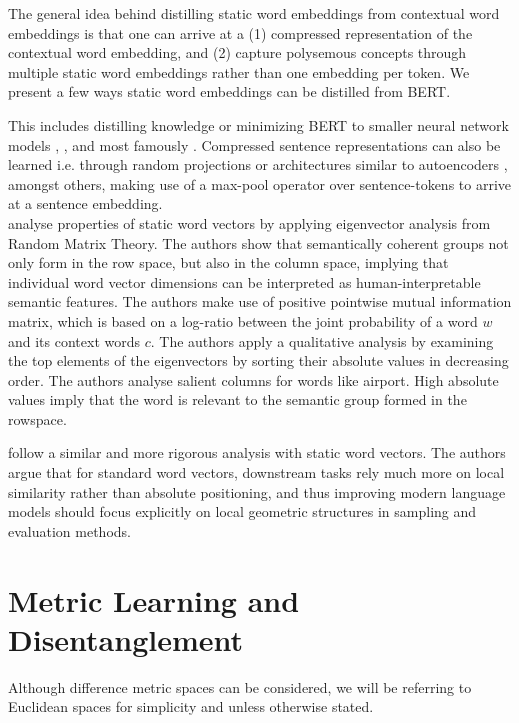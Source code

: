 \documentclass[a4paper,12pt,oneside,openright]{report}
\begin{document}
The general idea behind distilling static word embeddings from contextual word embeddings is that one can arrive at a (1) compressed representation of the contextual word embedding, and (2) capture polysemous concepts through multiple static word embeddings rather than one embedding per token. 
We present a few ways static word embeddings can be distilled from BERT.

This includes  distilling knowledge or minimizing BERT to smaller neural network models \cite{tang19}, \cite{tsai19}, and most famously \cite{sanh19}.
Compressed sentence representations can also be learned i.e. through random projections or architectures similar to autoencoders \cite{shen19}, amongst others, making use of a max-pool operator over sentence-tokens to arrive at a sentence embedding. \\

\cite{shin18} analyse properties of static word vectors by applying eigenvector analysis from Random Matrix Theory.
The authors show that semantically coherent groups not only form in the row space, but also in the column space, implying that individual word vector dimensions can be interpreted as human-interpretable semantic features.
The authors make use of positive pointwise mutual information matrix, which is based on a log-ratio between the joint probability of a word $w$ and its context words $c$.
The authors apply a qualitative analysis by examining the top elements of the eigenvectors by sorting their absolute values in decreasing order.
The authors analyse salient columns for words like airport.
High absolute values imply that the word is relevant to the semantic group formed in the rowspace.

\cite{whitaker19} follow a similar and more rigorous analysis with static word vectors. 
The authors argue that for standard word vectors, downstream tasks rely much more on local similarity rather than absolute positioning, and thus improving modern language models should focus explicitly on local geometric structures in sampling and evaluation methods.

\section{Metric Learning and Disentanglement}
\label{appendix:metric_learning}

Although difference metric spaces can be considered, we will be referring to Euclidean spaces for simplicity and unless otherwise stated.
\end{document}
